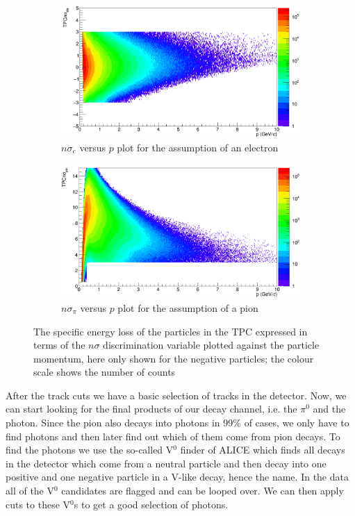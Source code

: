 \begin{figure}
\begin{subfigure}[t]{0.5\linewidth}
\centering
\includegraphics[width=0.98\linewidth]{Figures/V0cuts/tpcnsigmaeleneg.png}
\caption{$n\sigma_e$ versus $p$ plot for the assumption of an electron}
\label{fig:V0tpcele}
\end{subfigure} \hspace{0.1cm}
\begin{subfigure}[t]{.5\linewidth}
\centering
\includegraphics[width=0.98\linewidth]{Figures/V0cuts/tpcnsigmapioneg.png}
\caption{$n\sigma_{\pi}$ versus $p$ plot for the assumption of a pion}
\label{fig:V0tpcpio}
\end{subfigure}
\caption{The specific energy loss of the particles in the TPC expressed in terms of the $n\sigma$ discrimination variable plotted against the particle momentum, here only shown for the negative particles; the colour scale shows the number of counts}
\label{fig:V0tpc}
\end{figure}
After the track cuts we have a basic selection of tracks in the detector. Now, we can start looking for the final products of our decay channel, i.e. the $\pi^0$ and the photon. Since the pion also decays into photons in 99\% of cases, we only have to find photons and then later find out which of them come from pion decays. To find the photons we use the so-called V$^0$ finder of ALICE which finds all decays in the detector which come from a neutral particle and then decay into one positive and one negative particle in a V-like decay, hence the name. In the data all of the V$^0$ candidates are flagged and can be looped over. We can then apply cuts to these V$^0$s to get a good selection of photons. \\
